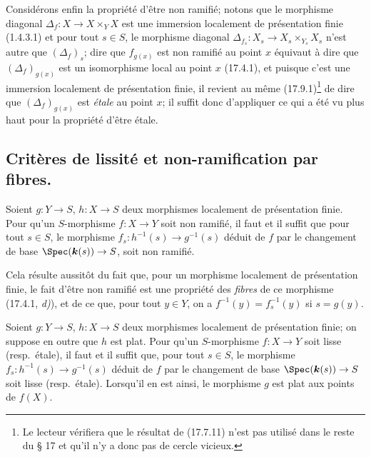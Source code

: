 Considérons enfin la propriété d'être non ramifié; notons que le morphisme diagonal $\Delta_f:X\to X\times_Y X$ est une immersion localement de présentation finie (1.4.3.1) et pour tout $s\in S$, le morphisme diagonal $\Delta_{f_s}:X_s\to X_s\times_{Y_s}X_s$ n'est autre que $(\Delta_f)_s$; dire que $f_{g(x)}$ est non ramifié au point $x$ équivaut à dire que $(\Delta_f)_{g(x)}$ est un isomorphisme local au point $x$ (17.4.1), et puisque c'est une immersion localement de présentation finie, il revient au même (17.9.1)\footnote{Le lecteur vérifiera que le résultat de (17.7.11) n'est pas utilisé dans le reste du § 17 et qu'il n'y a donc pas de cercle vicieux.} de dire que $(\Delta_f)_{g(x)}$ est \emph{étale} au point $x$; il suffit donc d'appliquer ce qui a été vu plus haut pour la propriété d'être étale.


\subsection{Critères de lissité et non-ramification par fibres.}
\label{IV.17.8}

\begin{proposition}[17.8.1]
\label{IV.17.8.1}
Soient $g:Y\to S$, $h:X\to S$ deux morphismes localement de présentation finie. Pour qu'un $S$-morphisme $f:X\to Y$ soit non ramifié, il faut et il suffit que pour tout $s\in S$, le morphisme $f_s:h^{-1}(s)\to g^{-1}(s)$ déduit de $f$ par le changement de base $\Spec(\boldsymbol{k}(s))\to S$, soit non ramifié.
\end{proposition}

Cela résulte aussitôt du fait que, pour un morphisme localement de présentation finie, le fait d'être non ramifié est une propriété des \emph{fibres} de ce morphisme (17.4.1, \emph{d)}), et de ce que, pour tout $y\in Y$, on a $f^{-1}(y)=f_s^{-1}(y)$ si $s=g(y)$.

\begin{proposition}[17.8.2]
\label{IV.17.8.2}
Soient $g:Y\to S$, $h:X\to S$ deux morphismes localement de présentation finie; on suppose en outre que $h$ est \textup{plat}. Pour qu'un $S$-morphisme $f:X\to Y$ soit lisse \textup{(resp.}\ étale\textup{)}, il faut et il suffit que, pour tout $s\in S$, le morphisme $f_s:h^{-1}(s)\to g^{-1}(s)$ déduit de $f$ par le changement de base $\Spec(\boldsymbol{k}(s))\to S$ soit lisse \textup{(resp.}\ étale\textup{)}. Lorsqu'il en est ainsi, le morphisme $g$ est plat aux points de $f(X)$.
\end{proposition}

